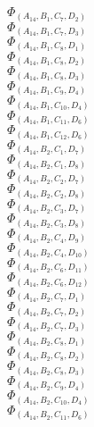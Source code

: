 \documentclass[14pt]{article}
\begin{document}
    $\Phi_{({A}_{14}, {B}_{1}, {C}_{7}, {D}_{2})}$ \\ 
    $\Phi_{({A}_{14}, {B}_{1}, {C}_{7}, {D}_{3})}$ \\ 
    $\Phi_{({A}_{14}, {B}_{1}, {C}_{8}, {D}_{1})}$ \\ 
    $\Phi_{({A}_{14}, {B}_{1}, {C}_{8}, {D}_{2})}$ \\ 
    $\Phi_{({A}_{14}, {B}_{1}, {C}_{8}, {D}_{3})}$ \\ 
    $\Phi_{({A}_{14}, {B}_{1}, {C}_{9}, {D}_{4})}$ \\ 
    $\Phi_{({A}_{14}, {B}_{1}, {C}_{10}, {D}_{4})}$ \\ 
    $\Phi_{({A}_{14}, {B}_{1}, {C}_{11}, {D}_{6})}$ \\ 
    $\Phi_{({A}_{14}, {B}_{1}, {C}_{12}, {D}_{6})}$ \\ 
    $\Phi_{({A}_{14}, {B}_{2}, {C}_{1}, {D}_{7})}$ \\ 
    $\Phi_{({A}_{14}, {B}_{2}, {C}_{1}, {D}_{8})}$ \\ 
    $\Phi_{({A}_{14}, {B}_{2}, {C}_{2}, {D}_{7})}$ \\ 
    $\Phi_{({A}_{14}, {B}_{2}, {C}_{2}, {D}_{8})}$ \\ 
    $\Phi_{({A}_{14}, {B}_{2}, {C}_{3}, {D}_{7})}$ \\ 
    $\Phi_{({A}_{14}, {B}_{2}, {C}_{3}, {D}_{8})}$ \\ 
    $\Phi_{({A}_{14}, {B}_{2}, {C}_{4}, {D}_{9})}$ \\ 
    $\Phi_{({A}_{14}, {B}_{2}, {C}_{4}, {D}_{10})}$ \\ 
    $\Phi_{({A}_{14}, {B}_{2}, {C}_{6}, {D}_{11})}$ \\ 
    $\Phi_{({A}_{14}, {B}_{2}, {C}_{6}, {D}_{12})}$ \\ 
    $\Phi_{({A}_{14}, {B}_{2}, {C}_{7}, {D}_{1})}$ \\ 
    $\Phi_{({A}_{14}, {B}_{2}, {C}_{7}, {D}_{2})}$ \\ 
    $\Phi_{({A}_{14}, {B}_{2}, {C}_{7}, {D}_{3})}$ \\ 
    $\Phi_{({A}_{14}, {B}_{2}, {C}_{8}, {D}_{1})}$ \\ 
    $\Phi_{({A}_{14}, {B}_{2}, {C}_{8}, {D}_{2})}$ \\ 
    $\Phi_{({A}_{14}, {B}_{2}, {C}_{8}, {D}_{3})}$ \\ 
    $\Phi_{({A}_{14}, {B}_{2}, {C}_{9}, {D}_{4})}$ \\ 
    $\Phi_{({A}_{14}, {B}_{2}, {C}_{10}, {D}_{4})}$ \\ 
    $\Phi_{({A}_{14}, {B}_{2}, {C}_{11}, {D}_{6})}$ \\ 
\end{document}
